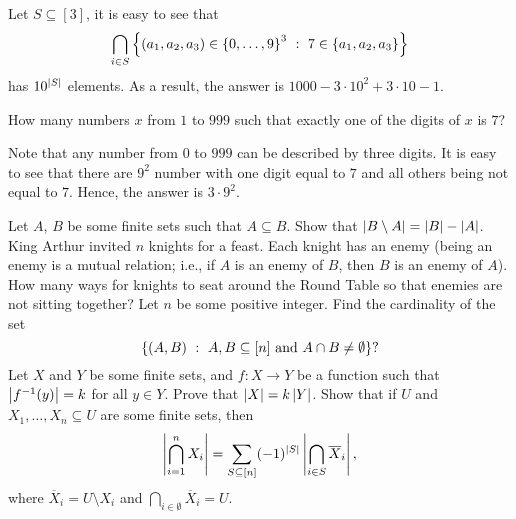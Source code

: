 \begin{chapterendexercises}
\begin{solution}
      Let $S \subseteq [3]$, it is easy to see that 
      \[
        \bigcap_{i \in S}
          \set[{ 
            7 \in \{a_1, a_2, a_3\}
          }]{(a_1, a_2, a_3) \in \set{0, \dots, 9}^3}
      \]
      has $10^{\left|{S}\right|}$ elements. As a result, the answer is 
      $1000 - 3 \cdot 10^2 + 3 \cdot 10 - 1$.
    \end{solution}
  \exercise How many numbers $x$ from $1$ to $999$ such that exactly one
    of the digits of $x$ is $7$?
    \begin{solution}
      Note that any number from $0$ to $999$ can be described by three digits.
      It is easy to see that there are $9^2$ number with one digit equal to $7$
      and all others being not equal to $7$. Hence, the answer is $3 \cdot
      9^2$.
    \end{solution}
  \exercise Let $A$, $B$ be some finite sets such that $A \subseteq B$.
    Show that $\left|{B \setminus A}\right| = \left|{B}\right| - \left|{A}\right|$.
  \exercise King Arthur invited $n$ knights for a feast. Each knight has an enemy
    (being an enemy is a mutual relation; i.e., if $A$ is an enemy of $B$, then
    $B$ is an enemy of $A$). How many ways for knights to seat around the Round
    Table so that enemies are not sitting together?
  \exercise[recommended] Let $n$ be some positive integer.
    Find the cardinality of the set
    \[
      \set[{A, B \subseteq \range{n} \text{ and } A \cap B \neq \emptyset}]{(A, B)}?
    \]
  \exercise Let $X$ and $Y$ be some finite sets, and $f : X \to Y$ be a function
    such that $\left|{f^{-1}(y)}\right| = k$ for all $y \in Y$. Prove that
    $\left|{X}\right| = k\left|{Y}\right|$.
  \exercise[recommended] Show that if $U$ and $X_1, \dots, X_n \subseteq U$ are
    some finite sets, then
    \[
      \left|{\bigcap_{i = 1}^n X_i}\right| =
      \sum_{S \subseteq {[{n}]}} (-1)^{\left|{S}\right|}
        \left|{\bigcap_{i \in S} \overline{X}_i}\right|,
    \]
    where $\overline{X}_i = U \setminus X_i$ and
    $\bigcap_{i \in \emptyset} \overline{X}_i = U$.
\end{chapterendexercises}
